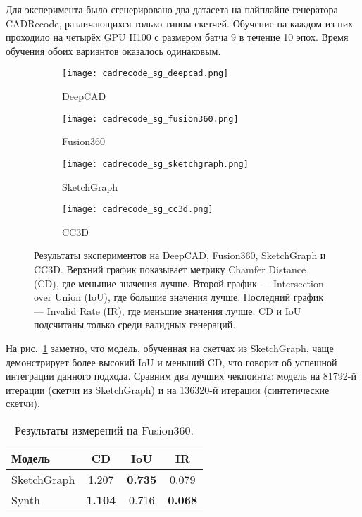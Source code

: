 Для эксперимента было сгенерировано два датасета на пайплайне генератора CADRecode, различающихся только типом скетчей. Обучение на каждом из них проходило на четырёх GPU H100 с размером батча 9 в течение 10 эпох. Время обучения обоих вариантов оказалось одинаковым.

\begin{figure}[h!]
    \centering
    \begin{subfigure}{0.45\linewidth}
        \centering
        \texttt{[image: cadrecode\_sg\_deepcad.png]}
        \caption{DeepCAD}
    \end{subfigure}
    \hfill
    \begin{subfigure}{0.45\linewidth}
        \centering
        \texttt{[image: cadrecode\_sg\_fusion360.png]}
        \caption{Fusion360}
    \end{subfigure}

    \vspace{1em}

    \begin{subfigure}{0.45\linewidth}
        \centering
        \texttt{[image: cadrecode\_sg\_sketchgraph.png]}
        \caption{SketchGraph}
    \end{subfigure}
    \hfill
    \begin{subfigure}{0.45\linewidth}
        \centering
        \texttt{[image: cadrecode\_sg\_cc3d.png]}
        \caption{CC3D}
    \end{subfigure}

    \caption{Результаты экспериментов на DeepCAD, Fusion360, SketchGraph и CC3D.
        Верхний график показывает метрику Chamfer Distance (CD), где меньшие значения лучше.
        Второй график — Intersection over Union (IoU), где большие значения лучше.
        Последний график — Invalid Rate (IR), где меньшие значения лучше.
        CD и IoU подсчитаны только среди валидных генераций.}
    \label{fig:exp5}
\end{figure}

На рис.~\ref{fig:exp5} заметно, что модель, обученная на скетчах из SketchGraph, чаще демонстрирует более высокий IoU и меньший CD, что говорит об успешной интеграции данного подхода.
Сравним два лучших чекпоинта: модель на 81792-й итерации (скетчи из SketchGraph) и на 136320-й итерации (синтетические скетчи).

\begin{table}[h!]
    \centering
    \begin{tabular}{lccc}
        \toprule
        \textbf{Модель} & \textbf{CD}    & \textbf{IoU}   & \textbf{IR}    \\
        \midrule
        SketchGraph     & 1.207          & \textbf{0.735} & 0.079          \\
        Synth           & \textbf{1.104} & 0.716          & \textbf{0.068} \\
        \bottomrule
    \end{tabular}
    \caption{Результаты измерений на Fusion360.}
\end{table}

